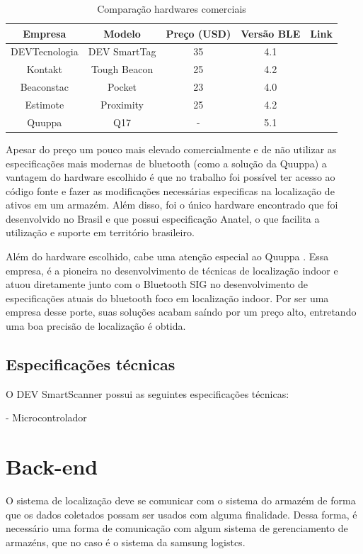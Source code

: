 \begin{table}[H]
    \centering
    \begin{tabular}{||c c c c c||}
    \hline
    Empresa & Modelo & Preço (USD) & Versão BLE & Link \\ [0.5ex]
    \hline\hline
    DEVTecnologia & DEV SmartTag & 35 & 4.1 & \cite{DEV_Site}\\
    \hline
    Kontakt & Tough Beacon & 25  & 4.2 & \cite{Kontakt_Site}\\
    \hline
    Beaconstac & Pocket & 23  & 4.0 & \cite{Beaconstac_Site}\\
    \hline
    Estimote & Proximity & 25 & 4.2 & \cite{Estimote_Site}\\
    \hline
    Quuppa & Q17 & -  & 5.1 & \cite{Quuppa_Site}\\ [0.5ex]
    \hline
    \end{tabular}
    \caption{Comparação hardwares comerciais}
    \label{tab: Tabela Comercial}
\end{table}


Apesar do preço um pouco mais elevado comercialmente e de não utilizar as especificações mais modernas de bluetooth (como a solução da Quuppa) a vantagem do hardware escolhido é que no trabalho foi possível ter acesso ao código fonte e fazer as modificações necessárias especificas na localização de ativos em um armazém. Além disso, foi o único hardware encontrado que foi desenvolvido no Brasil e que possui especificação Anatel, o que facilita a utilização e suporte em território brasileiro.

Além do hardware escolhido, cabe uma atenção especial ao Quuppa \cite{Quuppa_Site}. Essa empresa, é a pioneira no desenvolvimento de técnicas de localização indoor e atuou diretamente junto com o Bluetooth SIG no desenvolvimento de especificações atuais do bluetooth foco em localização indoor. Por ser uma empresa desse porte, suas soluções acabam saíndo por um preço alto, entretando uma boa precisão de localização é obtida.

\subsection{Especificações técnicas}
O DEV SmartScanner possui as seguintes especificações técnicas:


- Microcontrolador

\section{Back-end}
O sistema de localização deve se comunicar com o sistema do armazém de forma que os dados coletados possam ser usados com alguma finalidade. Dessa forma, é necessário uma forma de comunicação com algum sistema de gerenciamento de armazéns, que no caso é o sistema da samsung logistcs.

